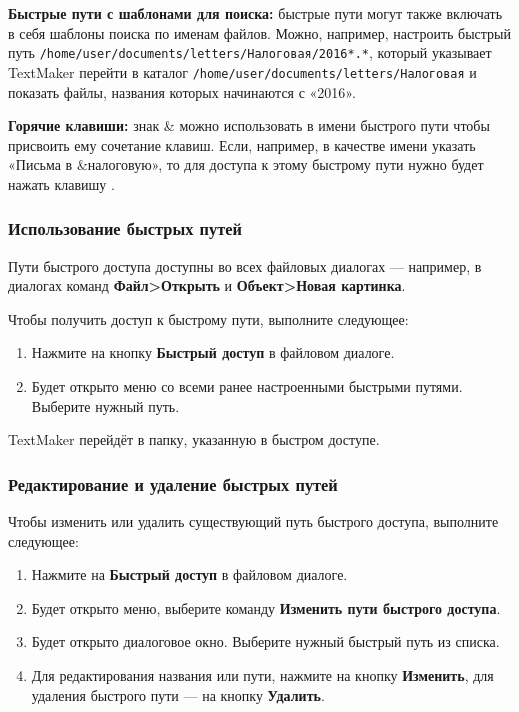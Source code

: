 ﻿\documentclass[a4paper,10pt]{article}
\begin{document}
\textbf{Быстрые пути с шаблонами для поиска:} быстрые пути могут также включать в себя шаблоны поиска по именам файлов. Можно, например, настроить быстрый путь \texttt{/home/user/documents/letters/Налоговая/2016*.*}, который указывает TextMaker перейти в каталог \texttt{/home/user/documents/letters/Налоговая} и показать файлы, названия которых начинаются с «2016».

\textbf{Горячие клавиши:} знак \& можно использовать в имени быстрого пути чтобы присвоить ему сочетание клавиш. Если, например, в качестве имени указать «Письма в \&налоговую», то для доступа к этому быстрому пути нужно будет нажать клавишу .

\subsubsection{Использование быстрых путей}
Пути быстрого доступа доступны во всех файловых диалогах — например, в диалогах команд \textbf{Файл>Открыть} и  \textbf{Объект>Новая картинка}.

Чтобы получить доступ к быстрому пути, выполните следующее:
\begin{enumerate}
 \item Нажмите на кнопку \textbf{Быстрый доступ} в файловом диалоге.
 \item Будет открыто меню со всеми ранее настроенными быстрыми путями. Выберите нужный путь.
\end{enumerate}

TextMaker перейдёт в папку, указанную в быстром доступе.

\subsubsection{Редактирование и удаление быстрых путей}
Чтобы изменить или удалить существующий путь быстрого доступа, выполните следующее:
\begin{enumerate}
 \item Нажмите на \textbf{Быстрый доступ} в файловом диалоге.
 \item Будет открыто меню, выберите команду \textbf{Изменить пути быстрого доступа}.
 \item Будет открыто диалоговое окно. Выберите нужный быстрый путь из списка.
 \item Для редактирования названия или пути, нажмите на кнопку \textbf{Изменить}, для удаления быстрого пути — на кнопку \textbf{Удалить}.
\end{enumerate}
\end{document}
